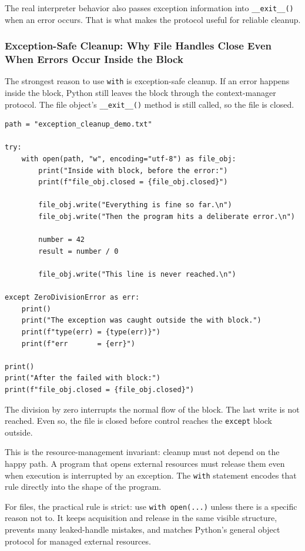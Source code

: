 The real interpreter behavior also passes exception information into \texttt{\_\_exit\_\_()} when an error occurs. That is what makes the protocol useful for reliable cleanup.

\subsubsection{Exception-Safe Cleanup: Why File Handles Close Even When Errors Occur Inside the Block}

The strongest reason to use \texttt{with} is exception-safe cleanup. If an error happens inside the block, Python still leaves the block through the context-manager protocol. The file object's \texttt{\_\_exit\_\_()} method is still called, so the file is closed.

\begin{verbatim}
path = "exception_cleanup_demo.txt"

try:
    with open(path, "w", encoding="utf-8") as file_obj:
        print("Inside with block, before the error:")
        print(f"file_obj.closed = {file_obj.closed}")

        file_obj.write("Everything is fine so far.\n")
        file_obj.write("Then the program hits a deliberate error.\n")

        number = 42
        result = number / 0

        file_obj.write("This line is never reached.\n")

except ZeroDivisionError as err:
    print()
    print("The exception was caught outside the with block.")
    print(f"type(err) = {type(err)}")
    print(f"err       = {err}")

print()
print("After the failed with block:")
print(f"file_obj.closed = {file_obj.closed}")
\end{verbatim}

The division by zero interrupts the normal flow of the block. The last write is not reached. Even so, the file is closed before control reaches the \texttt{except} block outside.

This is the resource-management invariant: cleanup must not depend on the happy path. A program that opens external resources must release them even when execution is interrupted by an exception. The \texttt{with} statement encodes that rule directly into the shape of the program.

For files, the practical rule is strict: use \texttt{with open(...)} unless there is a specific reason not to. It keeps acquisition and release in the same visible structure, prevents many leaked-handle mistakes, and matches Python's general object protocol for managed external resources.